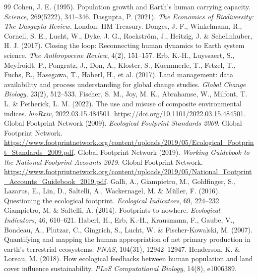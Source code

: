 \documentclass[preprint,12pt,authoryear]{elsarticle}
\begin{document}
\begin{thebibliography}{99}
 Cohen, J. E. (1995). Population growth and Earth's human carrying capacity. \emph{Science}, 269(5222), 341--346.
 Dasgupta, P. (2021). \emph{The Economics of Biodiversity: The Dasgupta Review.} London: HM Treasury.
 Donges, J. F., Winkelmann, R., Cornell, S. E., Lucht, W., Dyke, J. G., Rockstr\"om, J., Heitzig, J. \& Schellnhuber, H. J. (2017). Closing the loop: Reconnecting human dynamics to Earth system science. \emph{The Anthropocene Review}, 4(2), 151--157.
 Erb, K.-H., Luyssaert, S., Meyfroidt, P., Pongratz, J., Don, A., Kloster, S., Kuemmerle, T., Fetzel, T., Fuchs, R., Hasegawa, T., Haberl, H., et al. (2017). Land management: data availability and process understanding for global change studies. \emph{Global Change Biology}, 23(2), 512--533.
 Fischer, S. M., Joy, M. K., Abrahamse, W., Milfont, T. L. \& Petherick, L. M. (2022). The use and misuse of composite environmental indices. \emph{bioRxiv}, 2022.03.15.484501. \url{https://doi.org/10.1101/2022.03.15.484501}.
 Global Footprint Network (2009). \emph{Ecological Footprint Standards 2009}. Global Footprint Network. \url{https://www.footprintnetwork.org/content/uploads/2019/05/Ecological_Footprint_Standards_2009.pdf}.
 Global Footprint Network (2019). \emph{Working Guidebook to the National Footprint Accounts 2019}. Global Footprint Network. \url{https://www.footprintnetwork.org/content/uploads/2019/05/National_Footprint_Accounts_Guidebook_2019.pdf}.
 Galli, A., Giampietro, M., Goldfinger, S., Lazarus, E., Lin, D., Saltelli, A., Wackernagel, M. \& M\"uller, F. (2016). Questioning the ecological footprint. \emph{Ecological Indicators}, 69, 224--232.
 Giampietro, M. \& Saltelli, A. (2014). Footprints to nowhere. \emph{Ecological Indicators}, 46, 610--621.
 Haberl, H., Erb, K.-H., Krausmann, F., Gaube, V., Bondeau, A., Plutzar, C., Gingrich, S., Lucht, W. \& Fischer-Kowalski, M. (2007). Quantifying and mapping the human appropriation of net primary production in earth's terrestrial ecosystems. \emph{PNAS}, 104(31), 12942--12947.
 Henderson, K. \& Loreau, M. (2018). How ecological feedbacks between human population and land cover influence sustainability. \emph{PLoS Computational Biology}, 14(8), e1006389.

\end{thebibliography}
\end{document}
